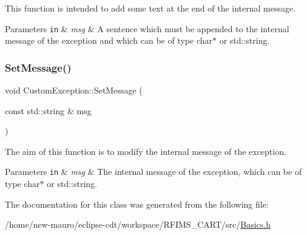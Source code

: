 This function is intended to add some text at the end of the internal message. 


\begin{DoxyParams}[1]{Parameters}
\mbox{\tt in}  & {\em msg} & A sentence which must be appended to the internal message of the exception and which can be of type {\ttfamily char$\ast$} or {\ttfamily std\+::string}. \\
\hline
\end{DoxyParams}
\mbox{\label{classCustomException_a54289001348effb40f5780bb7f263abb}} 
\subsubsection{\texorpdfstring{Set\+Message()}{SetMessage()}}
{\footnotesize\ttfamily void Custom\+Exception\+::\+Set\+Message (\begin{DoxyParamCaption}\item[{const std\+::string \&}]{msg }\end{DoxyParamCaption})\hspace{0.3cm}{\ttfamily [inline]}}



The aim of this function is to modify the internal message of the exception. 


\begin{DoxyParams}[1]{Parameters}
\mbox{\tt in}  & {\em msg} & The internal message of the exception, which can be of type {\ttfamily char$\ast$} or {\ttfamily std\+::string}. \\
\hline
\end{DoxyParams}


The documentation for this class was generated from the following file\+:\begin{DoxyCompactItemize}
\item 
/home/new-\/mauro/eclipse-\/cdt/workspace/\+R\+F\+I\+M\+S\+\_\+\+C\+A\+R\+T/src/\hyperlink{Basics_8h}{Basics.\+h}\end{DoxyCompactItemize}
